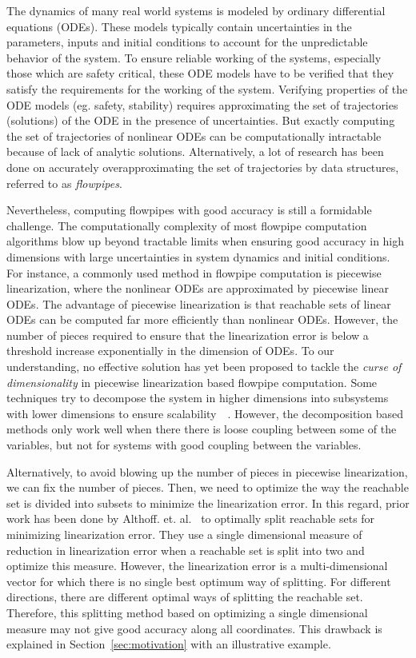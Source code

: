 The dynamics of many real world systems is modeled by ordinary
differential equations (ODEs).  These models typically contain
uncertainties in the parameters, inputs and initial conditions to
account for the unpredictable behavior of the system.  To ensure
reliable working of the systems, especially those which are safety
critical, these ODE models have to be verified that they satisfy the
requirements for the working of the system.  Verifying properties of
the ODE models (eg. safety, stability) requires approximating the set
of trajectories (solutions) of the ODE in the presence of
uncertainties.  But exactly computing the set of trajectories of
nonlinear ODEs can be computationally intractable because of lack of
analytic solutions.  Alternatively, a lot of research has been done on
accurately overapproximating the set of trajectories by data
structures, referred to as \emph{flowpipes}.

Nevertheless, computing flowpipes with good accuracy is still a
formidable challenge.  The computationally complexity of most flowpipe
computation algorithms blow up beyond tractable limits when ensuring
good accuracy in high dimensions with large uncertainties in system
dynamics and initial conditions.  For instance, a commonly used method
in flowpipe computation is piecewise linearization, where the
nonlinear ODEs are approximated by piecewise linear ODEs.  The
advantage of piecewise linearization is that reachable sets of linear
ODEs can be computed far more efficiently than nonlinear ODEs.
However, the number of pieces required to ensure that the
linearization error is below a threshold increase exponentially in the
dimension of ODEs.  To our understanding, no effective solution has
yet been proposed to tackle the \emph{curse of dimensionality} in
piecewise linearization based flowpipe computation.  Some techniques
try to decompose the system in higher dimensions into subsystems with
lower dimensions to ensure
scalability~~\cite{chen2018decomposition,chen2016decomposed}.
However, the decomposition based methods only work well when there
there is loose coupling between some of the variables, but not for
systems with good coupling between the variables.

Alternatively, to avoid blowing up the number of pieces in piecewise
linearization, we can fix the number of pieces.  Then, we need to
optimize the way the reachable set is divided into subsets to minimize
the linearization error.  In this regard, prior work has been done by
Althoff. et. al.~\cite{althoff2008reachability} to optimally split
reachable sets for minimizing linearization error.  They use a single
dimensional measure of reduction in linearization error when a
reachable set is split into two and optimize this measure.  However,
the linearization error is a multi-dimensional vector for which there
is no single best optimum way of splitting.  For different directions,
there are different optimal ways of splitting the reachable set.
Therefore, this splitting method based on optimizing a single
dimensional measure may not give good accuracy along all coordinates.
This drawback is explained in Section~\ref{sec:motivation} with an illustrative
example.

